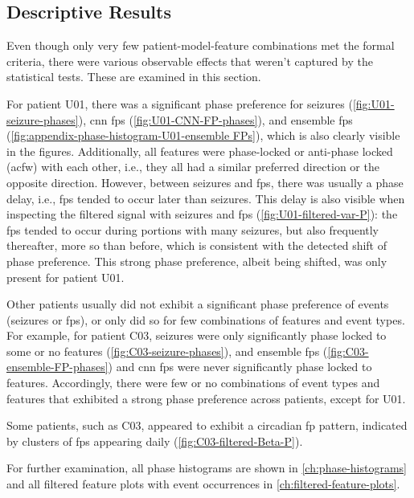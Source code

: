 \subsection{Descriptive Results} \label{subsec:descriptive-results}
Even though only very few patient-model-feature combinations met the formal criteria, there were various observable effects that weren't captured by the statistical tests.
These are examined in this section.

For patient U01, there was a significant phase preference for seizures (\cref{fig:U01-seizure-phases}), \gls{cnn} \glspl{fp} (\cref{fig:U01-CNN-FP-phases}), and ensemble \glspl{fp} (\cref{fig:appendix-phase-histogram-U01-ensemble FPs}), which is also clearly visible in the figures.
Additionally, all features were phase-locked or anti-phase locked (\gls{acfw}) with each other, i.e., they all had a similar preferred direction or the opposite direction.
However, between seizures and \glspl{fp}, there was usually a phase delay, i.e., \glspl{fp} tended to occur later than seizures.
This delay is also visible when inspecting the filtered signal with seizures and \glspl{fp} (\cref{fig:U01-filtered-var-P}): the \glspl{fp} tended to occur during portions with many seizures, but also frequently thereafter, more so than before, which is consistent with the detected shift of phase preference.
This strong phase preference, albeit being shifted, was only present for patient U01.

Other patients usually did not exhibit a significant phase preference of events (seizures or \glspl{fp}), or only did so for few combinations of features and event types.
For example, for patient C03, seizures were only significantly phase locked to some or no features (\cref{fig:C03-seizure-phases}), and ensemble \glspl{fp} (\cref{fig:C03-ensemble-FP-phases}) and \gls{cnn} \glspl{fp} were never significantly phase locked to features.
Accordingly, there were few or no combinations of event types and features that exhibited a strong phase preference across patients, except for U01.

Some patients, such as C03, appeared to exhibit a circadian \gls{fp} pattern, indicated by clusters of \glspl{fp} appearing daily (\cref{fig:C03-filtered-Beta-P}).

For further examination, all phase histograms are shown in \cref{ch:phase-histograms} and all filtered feature plots with event occurrences in \cref{ch:filtered-feature-plots}.

